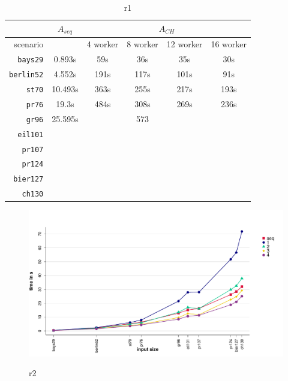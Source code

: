 \begin{table}[h!]
  \centering
  \begin{tabular}{r|c||c|c|c|c|}
    \cline{2-6}
    & \multicolumn{1}{c||}{$A_{seq}$} & \multicolumn{4}{c|}{$A_{CH}$} \\
    \hline
    \multicolumn{1}{|r||}{scenario} & & 4 worker & 8 worker & 12 worker & 16 worker \\
    \hline
    \hline
    \multicolumn{1}{|r||}{\texttt{bays29}} & 0.893s & 59s & 36s & 35s & 30s \\
    \hline
    \multicolumn{1}{|r||}{\texttt{berlin52}} & 4.552s & 191s & 117s & 101s & 91s \\
    \hline
    \multicolumn{1}{|r||}{\texttt{st70}} & 10.493s & 363s & 255s & 217s & 193s \\
    \hline
    \multicolumn{1}{|r||}{\texttt{pr76}} & 19.3s & 484s & 308s & 269s & 236s \\
    \hline
    \multicolumn{1}{|r||}{\texttt{gr96}} & 25.595s & & 573 & & \\
    \hline
    \multicolumn{1}{|r||}{\texttt{eil101}} & & & & & \\
    \hline
    \multicolumn{1}{|r||}{\texttt{pr107}} & & & & & \\
    \hline
    \multicolumn{1}{|r||}{\texttt{pr124}} & & & & & \\
    \hline
    \multicolumn{1}{|r||}{\texttt{bier127}} & & & & & \\
    \hline
    \multicolumn{1}{|r||}{\texttt{ch130}} & & & & & \\
    \hline
  \end{tabular}
  \caption{r1}
  \label{tbl:variation_ameisenanzahl}
\end{table}

\begin{figure}[h!]
  \centering
  \includegraphics[width=\textwidth]{img/test_distributed_1.pdf}
  \label{fig:test_distributed_1}
  \caption{r2}
\end{figure}